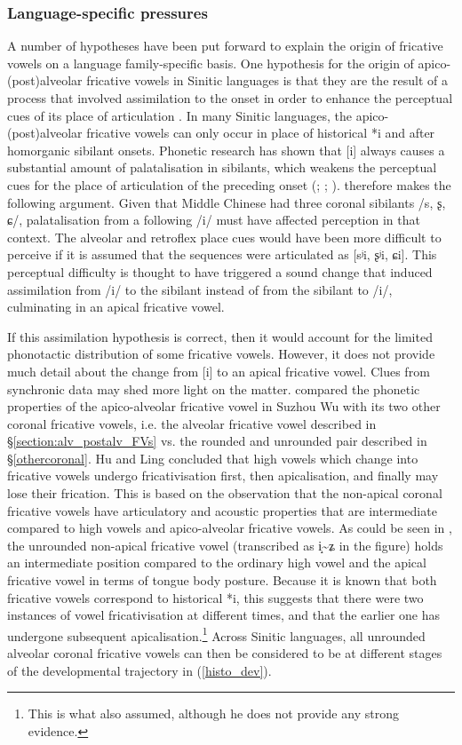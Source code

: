 \documentclass[output=paper,colorlinks,citecolor=brown,chinesefont]{langscibook}
\begin{document}
\subsubsection{Language-specific pressures}
A number of hypotheses have been put forward to explain the origin of fricative vowels on a language family-specific basis. One hypothesis for the origin of apico-(post)alveolar fricative vowels in Sinitic languages is that they are the result of a process that involved assimilation to the onset in order to enhance the perceptual cues of its place of articulation \citep{Lee-Kim_2014}. In many Sinitic languages, the apico-(post)alveolar fricative vowels can only occur in place of historical *i and after homorganic sibilant onsets. Phonetic research has shown that [i] always causes a substantial amount of palatalisation in sibilants, which weakens the perceptual cues for the place of articulation of the preceding onset (\cite{Lee-Kim_dissertation}; \cite{Lee-Kim_2014}; \cite{Li&Zhang_2017}). \citet{Lee-Kim_2014} therefore makes the following argument. Given that Middle Chinese had three coronal sibilants /s, ʂ, ɕ/, palatalisation from a following /i/ must have affected perception in that context. The alveolar and retroflex place cues would have been more difficult to perceive if it is assumed that the sequences were articulated as [sʲi, ʂʲi, ɕi]. This perceptual difficulty is thought to have triggered a sound change that induced assimilation from /i/ to the sibilant instead of from the sibilant to /i/, culminating in an apical fricative vowel.

If this assimilation hypothesis is correct, then it would account for the limited phonotactic distribution of some fricative vowels. However, it does not provide much detail about the change from [i] to an apical fricative vowel. Clues from synchronic data may shed more light on the matter. \citet{Hu&Ling_2019} compared the phonetic properties of the apico-alveolar fricative vowel in Suzhou Wu with its two other coronal fricative vowels, i.e. the alveolar fricative vowel described in §\ref{section:alv_postalv_FVs} vs. the rounded and unrounded pair described in §\ref{othercoronal}. Hu and Ling concluded that high vowels which change into fricative vowels undergo fricativisation first, then apicalisation, and finally may lose their frication. This is based on the observation that the non-apical coronal fricative vowels have articulatory and acoustic properties that are intermediate compared to high vowels and apico-alveolar fricative vowels. As could be seen in , the unrounded non-apical fricative vowel (transcribed as i̝{\textasciitilde}ʑ in the figure) holds an intermediate position compared to the ordinary high vowel and the apical fricative vowel in terms of tongue body posture. Because it is known that both fricative vowels correspond to historical *i, this suggests that there were two instances of vowel fricativisation at different times, and that the earlier one has undergone subsequent apicalisation.\footnote{This is what \citet{baron_1974} also assumed, although he does not provide any strong evidence.} Across Sinitic languages, all unrounded alveolar coronal fricative vowels can then be considered to be at different stages of the developmental trajectory in (\ref{histo_dev}).
\end{document}
